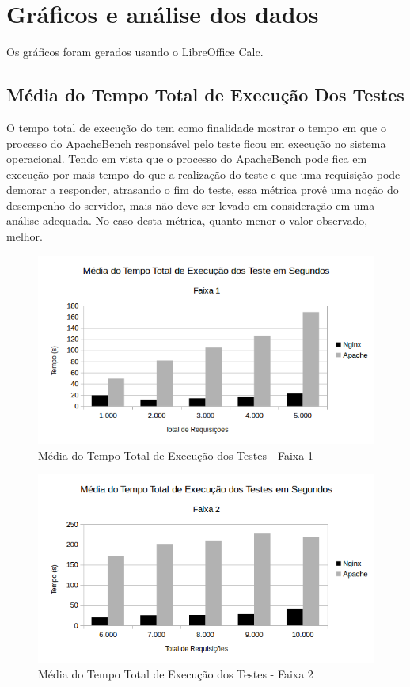 \section{Gráficos e análise dos dados}

Os gráficos foram gerados usando o LibreOffice Calc.

\subsection{Média do Tempo Total de Execução Dos Testes}

O tempo total de execução do tem como finalidade mostrar o tempo em que o 
processo do ApacheBench responsável pelo teste ficou em execução no sistema 
operacional. Tendo em vista que o processo do ApacheBench pode fica em execução 
por mais tempo do que a realização do teste e que uma requisição pode demorar a 
responder, atrasando o fim do teste, essa métrica provê uma noção do desempenho 
do servidor, mais não deve ser levado em consideração em uma análise adequada. 
No caso desta métrica, quanto menor o valor observado, melhor.

\begin{figure}[H]
	\centering
	\includegraphics[width=1\linewidth]{graficos/grafico1-f1} 
	\caption{Média do Tempo Total de Execução dos Testes - Faixa 1}
	\label{fig:grafico1-f1}
\end{figure}

\begin{figure}[H]
	\centering
	\includegraphics[width=1\linewidth]{graficos/grafico1-f2} 
	\caption{Média do Tempo Total de Execução dos Testes - Faixa 2}
	\label{fig:grafico1-f2}
\end{figure}

